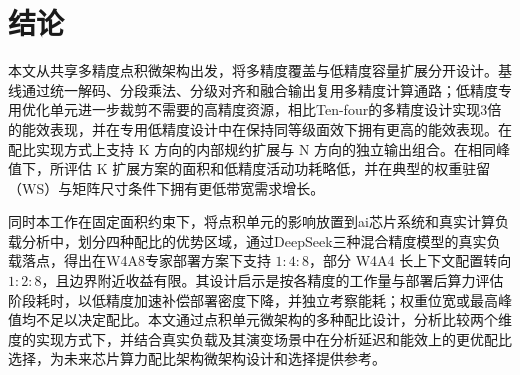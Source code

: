 \section{结论}
\label{sec:conclusion}

本文从共享多精度点积微架构出发，将多精度覆盖与低精度容量扩展分开设计。基线通过统一解码、分段乘法、分级对齐和融合输出复用多精度计算通路；低精度专用优化单元进一步裁剪不需要的高精度资源，相比Ten-four的多精度设计实现3倍的能效表现，并在专用低精度设计中在保持同等级面效下拥有更高的能效表现。在配比实现方式上支持 K 方向的内部规约扩展与 N 方向的独立输出组合。在相同峰值下，所评估 K 扩展方案的面积和低精度活动功耗略低，并在典型的权重驻留（WS）与矩阵尺寸条件下拥有更低带宽需求增长。

同时本工作在固定面积约束下，将点积单元的影响放置到ai芯片系统和真实计算负载分析中，划分四种配比的优势区域，通过DeepSeek三种混合精度模型的真实负载落点，得出在W4A8专家部署方案下支持 $1:4:8$，部分 W4A4 长上下文配置转向 $1:2:8$，且边界附近收益有限。其设计启示是按各精度的工作量与部署后算力评估阶段耗时，以低精度加速补偿部署密度下降，并独立考察能耗；权重位宽或最高峰值均不足以决定配比。本文通过点积单元微架构的多种配比设计，分析比较两个维度的实现方式下，并结合真实负载及其演变场景中在分析延迟和能效上的更优配比选择，为未来芯片算力配比架构微架构设计和选择提供参考。
